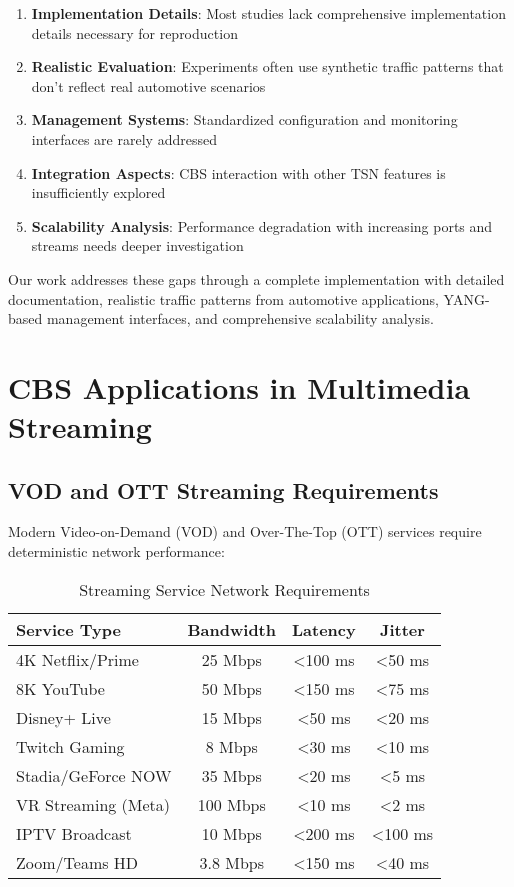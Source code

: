 \documentclass[10pt, journal, compsoc]{IEEEtran}
\begin{document}
\begin{enumerate}
    \item \textbf{Implementation Details}: Most studies lack comprehensive implementation details necessary for reproduction
    \item \textbf{Realistic Evaluation}: Experiments often use synthetic traffic patterns that don't reflect real automotive scenarios
    \item \textbf{Management Systems}: Standardized configuration and monitoring interfaces are rarely addressed
    \item \textbf{Integration Aspects}: CBS interaction with other TSN features is insufficiently explored
    \item \textbf{Scalability Analysis}: Performance degradation with increasing ports and streams needs deeper investigation
\end{enumerate}

Our work addresses these gaps through a complete implementation with detailed documentation, realistic traffic patterns from automotive applications, YANG-based management interfaces, and comprehensive scalability analysis.

\section{CBS Applications in Multimedia Streaming}
\label{sec:cbs_multimedia}

\subsection{VOD and OTT Streaming Requirements}

Modern Video-on-Demand (VOD) and Over-The-Top (OTT) services require deterministic network performance:

\begin{table}[h]
\centering
\caption{Streaming Service Network Requirements}
\label{tab:streaming_requirements}
\begin{tabular}{lccc}
\toprule
\textbf{Service Type} & \textbf{Bandwidth} & \textbf{Latency} & \textbf{Jitter} \\
\midrule
4K Netflix/Prime & 25 Mbps & <100 ms & <50 ms \\
8K YouTube & 50 Mbps & <150 ms & <75 ms \\
Disney+ Live & 15 Mbps & <50 ms & <20 ms \\
Twitch Gaming & 8 Mbps & <30 ms & <10 ms \\
Stadia/GeForce NOW & 35 Mbps & <20 ms & <5 ms \\
VR Streaming (Meta) & 100 Mbps & <10 ms & <2 ms \\
IPTV Broadcast & 10 Mbps & <200 ms & <100 ms \\
Zoom/Teams HD & 3.8 Mbps & <150 ms & <40 ms \\
\bottomrule
\end{tabular}
\end{table}
\end{document}
